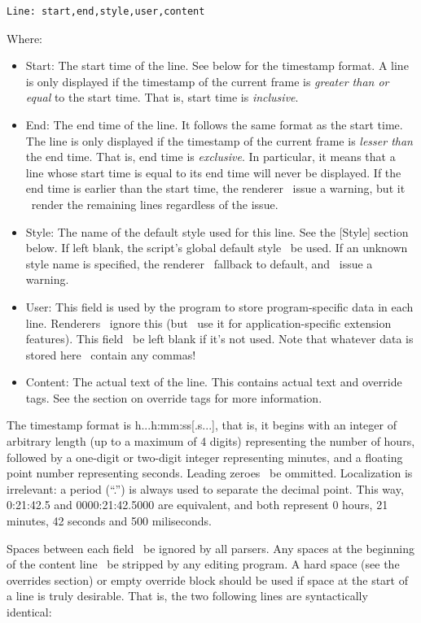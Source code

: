 \documentclass{spec}
\begin{document}
\begin{verbatim}
Line: start,end,style,user,content
\end{verbatim}

Where:

\begin{itemize}
\item Start: The start time of the line. See below for the timestamp format. A line is only displayed if
the timestamp of the current frame is \emph{greater than or equal} to the start time. That is, start
time is \emph{inclusive}.
\item End: The end time of the line. It follows the same format as the start time. The line is only
displayed if the timestamp of the current frame is \emph{lesser than} the end time. That is, end time is
\emph{exclusive}. In particular, it means that a line whose start time is equal to its end time will
never be displayed. If the end time is earlier than the start time, the renderer \may\ issue a warning,
but it \should\ render the remaining lines regardless of the issue.
\item Style: The name of the default style used for this line. See the [Style] section below. If left blank,
the script's global default style \must\ be used. If an unknown style name is specified, the renderer \must\
fallback to default, and \may\ issue a warning.
\item User: This field is used by the program to store program-specific data in each line. Renderers
\should\ ignore this (but \may\ use it for application-specific extension features). This field \should\
be left blank if it's not used. Note that whatever data is stored here \mustnot\ contain any commas!
\item Content: The actual text of the line. This contains actual text and override tags. See the section
on override tags for more information.
\end{itemize}

The timestamp format is h...h:mm:ss[.s...], that is, it begins with an integer of arbitrary length
(up to a maximum of 4 digits) representing the number of hours, followed by a one-digit or two-digit integer
representing minutes, and a floating point number representing seconds. Leading zeroes \may\ be ommitted.
Localization is irrelevant: a period (``.'') is always used to separate the decimal point. This way,
0:21:42.5 and 0000:21:42.5000 are equivalent, and both represent 0 hours, 21 minutes, 42 seconds and 500 miliseconds.

Spaces between each field \must\ be ignored by all parsers. Any spaces at the beginning of the
content line \should\ be stripped by any editing program. A hard space (see the overrides section) or empty
override block should be used if space at the start of a line is truly desirable. That is, the two
following lines are syntactically identical:
\end{document}
